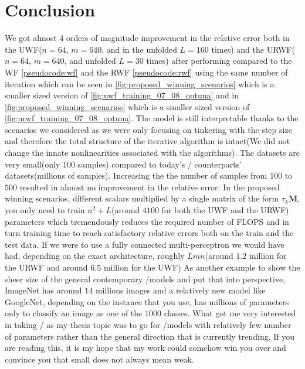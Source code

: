 \chapter{Conclusion}

We got almost $4$ orders of magnitude improvement in the relative error both in the \ac{UWF}($n=64$, $m=640$, 
and in the unfolded $L=160$ times) and the \ac{URWF}($n=64$, $m=640$, and unfolded $L=30$ times) after performing 
\ho \cite{Hutter2019}\cite{Akiba2019}\index{\hp} compared to the \ac{WF}\cite{Candes2014} 
\cref{pseudocode:wf} and the \ac{RWF}\cite{Zhang2016} 
\cref{pseudocode:rwf} using the same number of iteration which can be seen in 
\cref{fig:proposed_winning_scenarios} which is a smaller sized version of \cref{fig:uwf_training_07_08_optuna} and 
in \cref{fig:proposed_winning_scenarios} which is a smaller sized version of \cref{fig:urwf_training_07_08_optuna}. The model is still 
interpretable thanks to the scenarios we considered as we were only focusing on tinkering with the step size and therefore 
the total structure of the iterative algorithm is intact(We did not change the innate nonlinearities associated with the algorithms). 
The datasets are very small(only $100$ samples) compared to today's \ml/\dl \cite{Goodfellow2016}\cite{LeCun2015} 
counterparts' \cite{Krizhevsky2017}\cite{Szegedy2014} datasets(millions of samples). Increasing the the number of samples from $100$ to $500$ resulted in almost 
no improvement in the relative error. In the proposed winning scenarios, different scalars multiplied by a single matrix of the form $\tau_k\boldsymbol{M}$, you only need to train 
$n^2+L$(around $4100$ for both the \ac{UWF} and the \ac{URWF}) parameters which tremendously reduces the required number of 
\ac{FLOPS}\cite{Hager2010}\cite{Hennessy2019} and in turn training time to reach satisfactory 
relative errors both on the train and the test data. If we were to use a fully connected multi-perceptron \nn we would have 
had, depending on the exact architecture, roughly $Lmn$(around $1.2$ million for the \ac{URWF} and around $6.5$ million for the \ac{UWF}) 
As another example to show the sheer size of the general contemporary \ml/\dl models and put that into perspective, 
ImageNet\cite{Deng2009} has around $14$ millions images and a relatively new model like GoogleNet\cite{Szegedy2014}, 
depending on the instance that you use, has millions of parameters only to classify an image as one of the $1000$ 
classes. What got me very interested in taking \du/\au\cite{Monga2019} as my thesis topic was to go for \ml/\dl models with relatively few number of parameters 
rather than the general direction that is currently trending. If you are reading this, it is my hope that my work could 
somehow win you over and convince you that small does not always mean weak.


